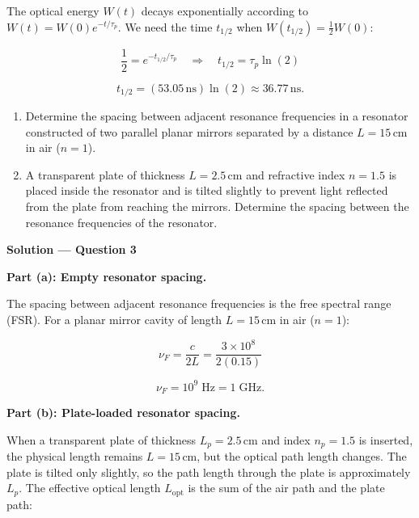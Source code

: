 The optical energy $W(t)$ decays exponentially according to $W(t) = W(0) e^{-t/\tau_p}$. We need the time $t_{1/2}$ when $W(t_{1/2}) = \frac{1}{2}W(0)$:

\begin{equation*}
  \frac{1}{2} = e^{-t_{1/2}/\tau_p} \quad\Longrightarrow\quad t_{1/2} = \tau_p \ln(2)
\end{equation*}

\begin{equation*}
  \boxed{t_{1/2} = (53.05\,\text{ns})\ln(2) \approx 36.77\,\text{ns}.}
\end{equation*}


\begin{question}[Question 3]\begin{enumerate}[label=(\alph*)]
  \item Determine the spacing between adjacent resonance frequencies in a resonator constructed
        of two parallel planar mirrors separated by a distance $L=15$\,cm in air ($n=1$).
  \item A transparent plate of thickness $L=2.5$\,cm and refractive index $n=1.5$ is placed
        inside the resonator and is tilted slightly to prevent light reflected from the plate
        from reaching the mirrors. Determine the spacing between the resonance frequencies of
        the resonator.
\end{enumerate}
\end{question}

\textbf{\large Solution --- Question 3}

\textbf{Part (a): Empty resonator spacing.}

The spacing between adjacent resonance frequencies is the free spectral range (FSR). For a planar mirror cavity of length $L=15$\,cm in air ($n=1$):

\begin{equation*}
  \nu_F = \frac{c}{2L} = \frac{3\times10^{8}}{2(0.15)}
\end{equation*}

\begin{equation*}
  \boxed{\nu_F = 10^{9}\;\text{Hz} = 1\;\text{GHz}.}
\end{equation*}

\textbf{Part (b): Plate-loaded resonator spacing.}

When a transparent plate of thickness $L_p = 2.5$\,cm and index $n_p = 1.5$ is inserted, the physical length remains $L=15$\,cm, but the optical path length changes. The plate is tilted only slightly, so the path length through the plate is approximately $L_p$. The effective optical length $L_{\text{opt}}$ is the sum of the air path and the plate path:

